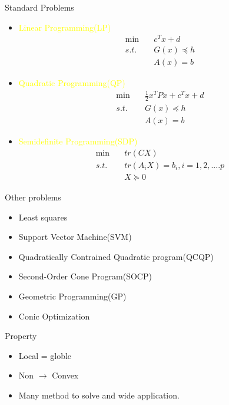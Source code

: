     \begin{frame}{Standard Problems}
      \vspace{-2pt}
      \begin{itemize}
        \item \textcolor{yellow}{Linear Programming(LP)}
        \[
        \begin{aligned}
        \min &\quad c^Tx+d \\
        s.t. &\quad G(x) \preceq h \\
            &\quad A(x) = b
        \end{aligned}
        \]
        \item \textcolor{yellow}{Quadratic Programming(QP)}
        \[
        \begin{aligned}
        \min &\quad \frac{1}{2}x^TPx+c^Tx+d \\
        s.t. &\quad G(x) \preceq h \\
             &\quad A(x) = b
        \end{aligned}
        \]
        \item \textcolor{yellow}{Semidefinite Programming(SDP)}
        \[
        \begin{aligned}
        \min &\quad tr(CX) \\
        s.t. &\quad tr(A_iX)=b_i, i=1,2,....p \\
             &\quad X \succeq 0
        \end{aligned}
        \]
      \end{itemize}
    \end{frame}

    \begin{frame}{Other problems}
      \Large
      \begin{itemize}
        \item Least squares
        \item Support Vector Machine(SVM)
        \item Quadratically Contrained Quadratic program(QCQP)
        \item Second-Order Cone Program(SOCP)
        \item Geometric Programming(GP)
        \item Conic Optimization
      \end{itemize}
    \end{frame}

    \begin{frame}{Property}
      \begin{itemize}
        \item Local = globle
        \item Non $\to$ Convex
        \item Many method to solve and wide application.
      \end{itemize}
    \end{frame}

